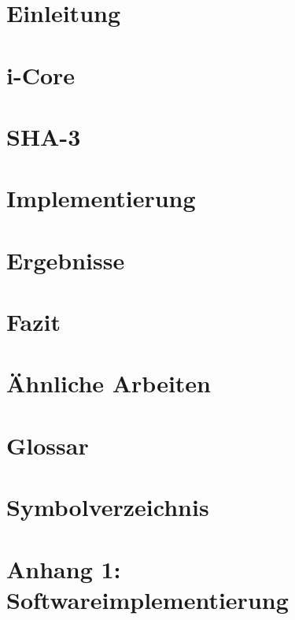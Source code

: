 \chapter{Einleitung}


\chapter{i-Core}


\chapter{SHA-3}


\chapter{Implementierung}


\newpage

\newpage


\chapter{Ergebnisse}


\chapter{Fazit}


\chapter{Ähnliche Arbeiten}


\chapter{Glossar}


\chapter{Symbolverzeichnis}


\chapter{Anhang 1: Softwareimplementierung}
\label{cha:anhang1}



